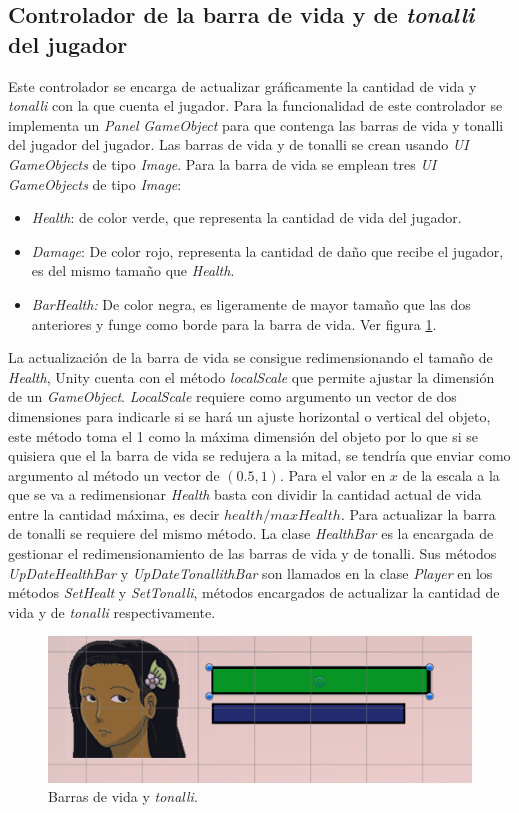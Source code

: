 \subsection{Controlador de la barra de vida y de \textit{tonalli} del jugador}
Este controlador se encarga de actualizar gráficamente la cantidad de vida y 
\textit{tonalli} con la que cuenta el jugador. Para la funcionalidad de este 
controlador se implementa un \textit{Panel} \textit{GameObject} para que 
contenga las barras de vida y tonalli del jugador del jugador. Las barras de 
vida y de tonalli se crean usando \textit{UI GameObjects} de tipo 
\textit{Image}. Para la barra de vida se emplean tres \textit{UI GameObjects} de 
tipo \textit{Image}:  
	\begin{itemize}
		\item \textit{Health}: de color verde, que representa la cantidad de 
		vida del jugador.
		\item \textit{Damage}: De color rojo, representa la cantidad de daño que 
		recibe el jugador, es del mismo tamaño que \textit{Health}.
		\item \textit{BarHealth:} De color negra, es ligeramente de mayor tamaño 
		que las dos anteriores y funge como borde para la barra de vida. Ver figura  \ref{fig:HealthBar}.
	\end{itemize}
La actualización de la barra de vida se consigue redimensionando el tamaño de 
\textit{Health}, Unity cuenta con el método \textit{localScale} que permite 
ajustar la dimensión de un \textit{GameObject}. \textit{LocalScale} requiere 
como argumento un vector de dos dimensiones para indicarle si se hará un ajuste 
horizontal o vertical del objeto, este método toma el 1 como la máxima dimensión 
del objeto por lo que si se quisiera que el la barra de vida se redujera a la 
mitad, se tendría que enviar como argumento al método un vector de $(0.5, 1)$. 
Para el valor en $x$ de la escala a la que se va a redimensionar \textit{Health} 
basta con dividir la cantidad actual de vida entre la cantidad máxima, es decir 
$health/maxHealth$. Para actualizar la barra de tonalli se requiere del mismo 
método. La clase \textit{HealthBar} es la encargada de gestionar el 
redimensionamiento de las barras de vida y de tonalli. Sus métodos 
\textit{UpDateHealthBar} y \textit{UpDateTonallithBar} son llamados en la clase 
\textit{Player} en los métodos \textit{SetHealt} y \textit{SetTonalli}, métodos 
encargados de actualizar la cantidad de vida y de \textit{tonalli} 
respectivamente. 

	\begin{figure}[h]
		\centering
		\includegraphics[height=0.1 \textheight]{03TrabajoRealizado/imagenes/attributesBar.png}
		\caption{Barras de vida y \textit{tonalli}.}
		\label{fig:HealthBar}
	\end{figure} 
	
